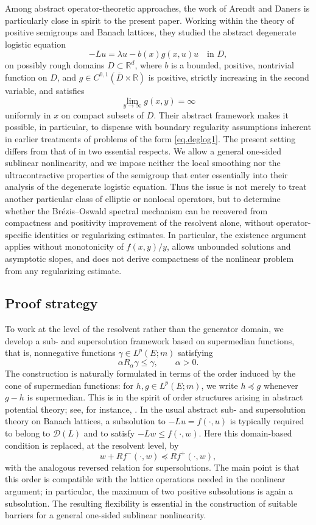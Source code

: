 \documentclass[11pt,a4paper,reqno]{amsart}
\theoremstyle{definition}
\numberwithin{equation}{section}
\begin{document}
Among abstract operator-theoretic approaches, the work of Arendt and Daners \cite{AD} 
is particularly close in spirit to the present paper. Working within the theory of positive 
semigroups and Banach lattices, they studied the abstract degenerate logistic equation
\begin{equation}
\label{eq.deglog1}
-Lu=\lambda u-b(x)g(x,u)u \quad\text{in }D,
\end{equation}
on possibly rough domains $D\subset\mathbb R^d$, where $b$ is a bounded, positive, nontrivial function on $D$, and
$g\in C^{0,1}(\overline D\times\mathbb R)$ is positive, strictly increasing in the second variable, and satisfies
\[
\lim_{y\to\infty}g(x,y)=\infty
\]
uniformly in $x$ on compact subsets of $D$. Their abstract framework makes it possible, in particular, 
to dispense with boundary regularity assumptions inherent in earlier treatments of problems of the form \eqref{eq.deglog1}.
The present setting differs from that of \cite{AD} in two essential respects. We allow a general one-sided 
sublinear nonlinearity, and we impose neither the local smoothing nor the ultracontractive 
properties of the semigroup that enter essentially into their analysis of the degenerate logistic equation.
Thus the issue is not merely to treat another particular class of
elliptic or nonlocal operators, but to determine whether the
Br\'ezis--Oswald spectral mechanism can be recovered from compactness
and positivity improvement of the resolvent alone, without
operator-specific identities or regularizing estimates. In particular, the existence argument applies without monotonicity of
$f(x,y)/y$, allows unbounded solutions and asymptotic slopes, and does not
derive compactness of the nonlinear problem from any regularizing estimate.


\subsection{Proof strategy}
To work at the level of the resolvent rather than the generator domain, 
we develop a sub- and supersolution
framework based on supermedian functions, that is, nonnegative functions $\gamma\in L^p(E;m)$ satisfying
\[
\alpha R_\alpha\gamma\leq\gamma,
\qquad \alpha>0.
\]
The construction is naturally formulated in terms of the order induced by the cone of supermedian functions: 
for $h,g\in L^p(E;m)$, we write $h\preceq g$ whenever $g-h$ is supermedian. 
This is in the spirit of order structures arising in abstract potential theory; see, for instance, \cite{BB}. 
In the usual abstract sub- and supersolution theory on Banach lattices, a subsolution to $-Lu=f(\cdot,u)$ 
is typically required to belong to $\mathscr D(L)$ and to satisfy $-Lw\leq f(\cdot,w)$. Here this domain-based 
condition is replaced, at the resolvent level, by
\[
w+Rf^-(\cdot,w)\preceq Rf^+(\cdot,w),
\]
with the analogous reversed relation for supersolutions. 
The main point is that this order is compatible with the lattice
operations needed in the nonlinear argument; in particular, the maximum of two positive
subsolutions is again a subsolution.
The resulting flexibility is essential in the construction of suitable barriers for a general one-sided sublinear nonlinearity.
\end{document}
